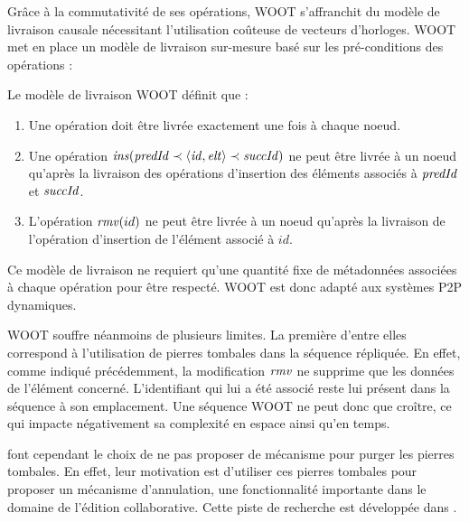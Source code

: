 Grâce à la commutativité de ses opérations, WOOT s'affranchit du modèle de livraison causale nécessitant l'utilisation coûteuse de vecteurs d'horloges.
WOOT met en place un modèle de livraison sur-mesure basé sur les pré-conditions des opérations :
\begin{definition}
  Le modèle de livraison WOOT définit que :
  \begin{enumerate}
    \item Une opération doit être livrée exactement une fois à chaque noeud\footnotemark.
    \item Une opération $\mathit{ins}(\mathit{predId} \prec \langle \mathit{id},\mathit{elt} \rangle \prec \mathit{succId})$ ne peut être livrée à un noeud qu'après la livraison des opérations d'insertion des éléments associés à $\mathit{predId}$ et $\mathit{succId}$.
    \item L'opération $\mathit{rmv}(id)$ ne peut être livrée à un noeud qu'après la livraison de l'opération d'insertion de l'élément associé à $id$.
  \end{enumerate}
\end{definition}
Ce modèle de livraison ne requiert qu'une quantité fixe de métadonnées associées à chaque opération pour être respecté.
WOOT est donc adapté aux systèmes \ac{P2P} dynamiques.

WOOT souffre néanmoins de plusieurs limites.
La première d'entre elles correspond à l'utilisation de pierres tombales dans la séquence répliquée.
En effet, comme indiqué précédemment, la modification $\mathit{rmv}$ ne supprime que les données de l'élément concerné.
L'identifiant qui lui a été associé reste lui présent dans la séquence à son emplacement.
Une séquence WOOT ne peut donc que croître, ce qui impacte négativement sa complexité en espace ainsi qu'en temps.

\textcite{2006-woot-oster} font cependant le choix de ne pas proposer de mécanisme pour purger les pierres tombales.
En effet, leur motivation est d'utiliser ces pierres tombales pour proposer un mécanisme d'annulation, une fonctionnalité importante dans le domaine de l'édition collaborative.
Cette piste de recherche est développée dans \cite{2009-undo-p2p-semantic-wikis-rahhal}.


